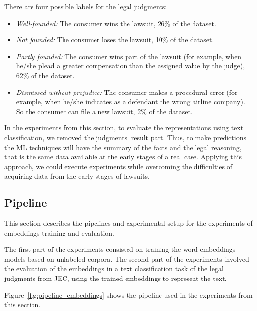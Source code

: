 There are four possible labels for the legal judgments:

\begin{itemize}[noitemsep]
    \item \textit{Well-founded:} The consumer wins the lawsuit, 26\% of the dataset.
    \item \textit{Not founded:} The consumer loses the lawsuit, 10\% of the dataset.
    \item \textit{Partly founded:} The consumer wins part of the lawsuit (for example, when he/she plead a greater compensation than the assigned value by the judge), 62\% of the dataset.
    \item \textit{Dismissed without prejudice:} The consumer makes a procedural error (for example, when he/she indicates as a defendant the wrong airline company). So the consumer can file a new lawsuit, 2\% of the dataset.
\end{itemize}

In the experiments from this section, to evaluate the representations using text classification, we removed the judgments' result part. Thus, to make predictions the \gls{ML} techniques will have the summary of the facts and the legal reasoning, that is the same data available at the early stages  of a real case.
Applying this approach, we could execute experiments while overcoming the difficulties of acquiring data from the early stages of lawsuits.

\subsection{Pipeline}\label{sec:pipeline_representation}

 
This section describes the pipelines and experimental setup for the experiments of embeddings training and evaluation.
 
The first part of the experiments consisted on training the word embeddings models based on  unlabeled corpora. 
The second part of the experiments involved the evaluation of the embeddings in a text classification task of the legal judgments from \gls{JEC}, using the trained embeddings to represent the text.
 
Figure~\ref{fig:pipeline_embeddings} shows the pipeline used in the experiments from this section.

